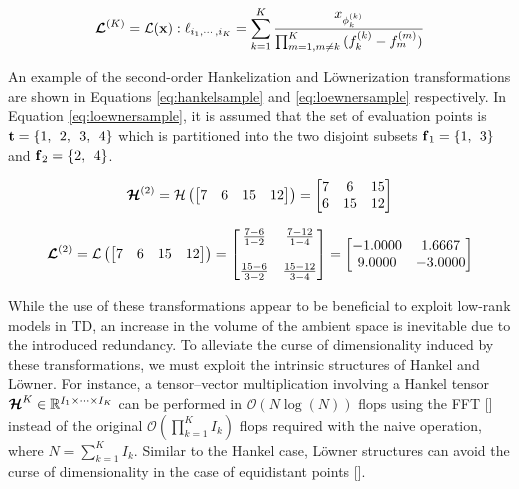 \documentclass[sensors,article,submit,moreauthors,pdftex]{Definitions/mdpi}
\newcommand{\mathvec}[1]{\boldsymbol{\mathbf{\MakeLowercase{#1}}}}
\newcommand{\mathten}[1]{\boldsymbol{\mathbf{\mathcal{\MakeUppercase{#1}}}}}
\begin{document}
\begin{equation}
\mathten{L}^{(K)} = \mathcal{L}(\mathvec{x}) : \ell_{i_1,\cdots,i_K} = \sum_{k=1}^{K}{ \frac{x_{\phi_{k}^{(k)}}}{\prod_{m=1,m\neq k}^{K}{(f_{k}^{(k)} - f_m^{(m)})}}}
\label{eq:loewnerization}
\end{equation}

An example of the second-order Hankelization and  L{\"o}wnerization transformations are shown in Equations \ref{eq:hankelsample} and \ref{eq:loewnersample} respectively. In Equation \ref{eq:loewnersample}, it is assumed that the set of evaluation points is $\mathvec{t}=\{1,\:\:2,\:\:3,\:\:4\}$ which is partitioned into the two disjoint subsets $\mathvec{f}_1=\{1,\:\:3\}$ and $\mathvec{f}_2=\{2,\:\:4\}$.

\begin{equation}
	\mathten{H}^{(2)} = \mathcal{H}\left(
	\begin{bmatrix}
		7 & 6 & 15 & 12
	\end{bmatrix}
	\right) =
	\begin{bmatrix}
	7 & 6 & 15 \\
	6 & 15 & 12
	\end{bmatrix}
	\label{eq:hankelsample}
\end{equation}

\begin{equation}
	\mathten{L}^{(2)} = \mathcal{L}\left(
	\begin{bmatrix}
	7 & 6 & 15 & 12
	\end{bmatrix}
	\right) = 
	\begin{bmatrix}
	\frac{7-6}{1-2} &  \frac{7-12}{1-4} \\
	\\
	 \frac{15-6}{3-2} & \frac{15-12}{3-4}
	\end{bmatrix}
	=
	\begin{bmatrix}
	-1.0000 &  1.6667 \\
	9.0000 & -3.0000
	\end{bmatrix}	
	\label{eq:loewnersample}
\end{equation}

While the use of these transformations appear to be beneficial to exploit low-rank models in TD, an increase in the volume of the ambient space is inevitable due to the introduced redundancy. To alleviate the curse of dimensionality induced by these transformations, we must exploit the intrinsic structures of Hankel and L{\"o}wner. For instance, a tensor–vector multiplication involving a Hankel tensor $\mathten{H}^{K} \in \mathbb{R}^{I_1 \times \cdots \times I_K}$ can be performed in $\mathcal{O}(N \log(N))$ flops using the FFT [] instead of the original $\mathcal{O}(\prod_{k=1}^{K} I_k)$ flops required with the naive operation, where $N=\sum_{k=1}^{K} I_k$. Similar to the Hankel case, L{\"o}wner structures can avoid the curse of dimensionality in the case of equidistant points [].
\end{document}
